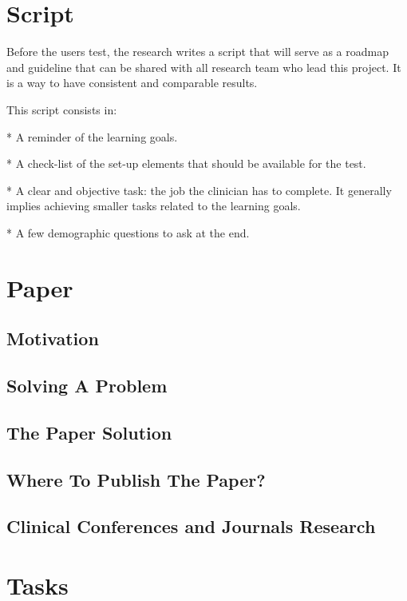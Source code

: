\section{Script}

Before the users test, the research writes a script that will serve as a roadmap and guideline that can be shared with all research team who lead this project. It is a way to have consistent and comparable results.

This script consists in:

* A reminder of the learning goals.

* A check-list of the set-up elements that should be available for the test.

* A clear and objective task: the job the clinician has to complete. It generally implies achieving smaller tasks related to the learning goals.

* A few demographic questions to ask at the end.

\section{Paper}

\subsection{Motivation}

\subsection{Solving A Problem}

\subsection{The Paper Solution}

\subsection{Where To Publish The Paper?}

\subsection{Clinical Conferences and Journals Research}

\section{Tasks}

